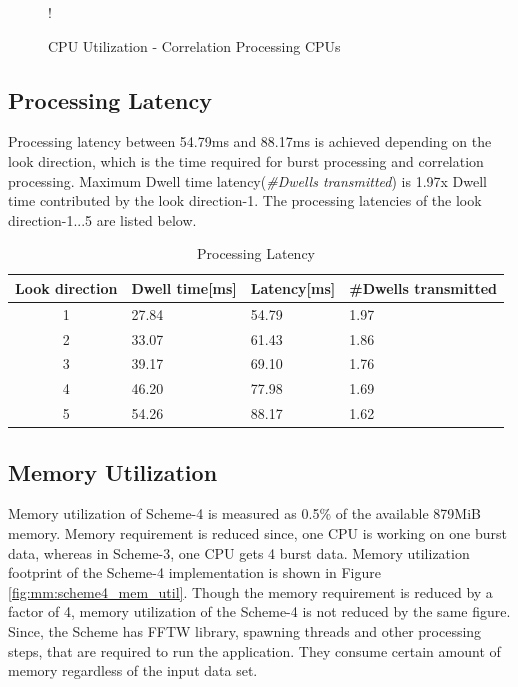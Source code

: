 \begin{figure}[h!]
\centering
\resizebox {10cm} {!} {
}
\caption{CPU Utilization - Correlation Processing CPUs}
\label{sch4:chrt:corr_cpu_util}
\end{figure}

\subsection{Processing Latency}
\label{ss:mm:scheme5:latency}
Processing latency between 54.79ms and 88.17ms is achieved depending on the look direction, which is the time required for burst processing and correlation processing. Maximum Dwell time latency(\textsl{\#Dwells transmitted}) is 1.97x Dwell time contributed by the look direction-1. The processing latencies of the look direction-1...5 are listed below. 

\begin{table}[h!]
	\centering
	\begin{tabular}{|c|l|l|l|} 
	 \hline
	 \textbf{Look direction} & \textbf{Dwell time[ms]} & \textbf{Latency[ms]} & \textbf{\#Dwells transmitted} \\
	 \hline
	 1 & 27.84 & 54.79 & 1.97 \\ \hline
	 2 & 33.07 & 61.43 & 1.86 \\ \hline
	 3 & 39.17 & 69.10 & 1.76 \\ \hline
	 4 & 46.20 & 77.98 & 1.69 \\ \hline
	 5 & 54.26 & 88.17 & 1.62 \\ \hline
	\end{tabular}
	\caption{Processing Latency}
	\label{tbl:mm:scheme5_latency}
\end{table}

\subsection{Memory Utilization}
\label{ss:mm:scheme5:mem_util}
Memory utilization of Scheme-4 is measured as 0.5\% of the available 879MiB memory. Memory requirement is reduced since, one CPU is working on one burst data, whereas in Scheme-3, one CPU gets 4 burst data. Memory utilization footprint of the Scheme-4 implementation is shown in Figure \ref{fig:mm:scheme4_mem_util}. Though the memory requirement is reduced by a factor of 4, memory utilization of the Scheme-4 is not reduced by the same figure. Since, the Scheme has FFTW library, spawning threads and other processing steps, that are required to run the application. They consume certain amount of memory regardless of the input data set.

